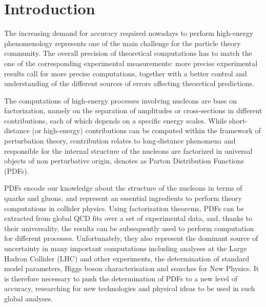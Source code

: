 \chapter*{Introduction}
The increasing demand for accuracy required nowadays to perform high-energy phenomenology
represents one of the main challenge for the particle theory community. The
overall precision of theoretical computations has to match the one of the corresponding
experimental measurements: more precise  
experimental results call for more precise computations, together with a better control
and understanding of the different sources of errors affecting theoretical predictions. 

The computations of high-energy processes involving nucleons are base on factorization, namely on the separation
of amplitudes or cross-sections in different contributions, each of which depends on a specific energy scales.
While short-distance (or high-energy) contributions can be computed within the framework of perturbation theory,
contribution relates to long-distance phenomena and responsible for the internal
structure of the nucleons are factorized in universal objects of non perturbative origin,
denotes as Parton Distribution Functions (PDFs).
 

PDFs encode our knowledge about the structure of the nucleons in terms of quarks and
gluons, and represent an essential ingredients to perform theory computations in collider physics.
Using factorization theorems, PDFs can be extracted from global QCD fits
over a set of experimental data, and, thanks to their universality, the results can be subsequently used
to perform computation for different processes. 
Unfortunately, they also represent the dominant source of uncertainty in many important computations
including analyses at the Large Hadron Collider (LHC) and other experiments,
the determination of standard model parameters, Higgs boson characterisation and searches for New Physics.
It is therefore necessary to push the determination of PDFs to a new level of accuracy,
researching for new technologies and physical ideas to be used in such global analyses.

